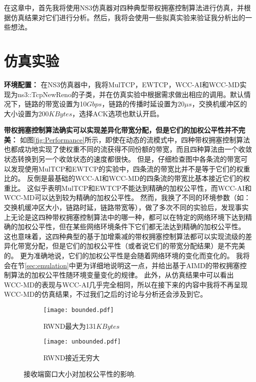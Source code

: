 \documentclass[winfonts]{njuthesis}
\begin{document}
在这章中，首先我将使用NS3仿真器\cite{NS3}对四种典型带权拥塞控制算法进行仿真，并根据仿真结果对它们进行分析。然后，我将会使用一些拟真实验来验证我分析出的一些想法。

\section{仿真实验}
\label{sec:simulation}

\textbf{环境配置：}
在NS3仿真器中，我将MulTCP，EWTCP，WCC-AI和WCC-MD实现为ns3::TcpNewReno的子类，并在仿真实验中根据需求做出相应的调用。默认情况下，链路的带宽设置为10$Gbps$，链路的传播时延设置为20$\mu s$，交换机缓冲区的大小设置为200$KBytes$，选择ACK选项也默认开启。

\textbf{带权拥塞控制算法确实可以实现差异化带宽分配，但是它们的加权公平性并不完美：}
如图\ref{fig:Performance}所示，即使在动态的流模式中，四种带权拥塞控制算法也都成功地实现了使权重不同的流获得不同份额的带宽，而且四种算法由一个收敛状态转换到另一个收敛状态的速度都很快。
但是，仔细检查图中各条流的带宽可以发现使用MulTCP和EWTCP的实验中，四条流的带宽比并不是等于它们的权重比的。
反倒是最基础的WCC-AI和WCC-MD的四条流的带宽比基本接近它们的权重比。
这似乎表明MulTCP和EWTCP不能达到精确的加权公平性，而WCC-AI和WCC-MD可以达到较为精确的加权公平性。
然而，我换了不同的环境参数（如：交换机缓冲区大小，链路时延，链路带宽等），做了多次不同的实验后，发现事实上无论是这四种带权拥塞控制算法中的哪一种，都可以在特定的网络环境下达到精确的加权公平性，但在某些网络环境条件下它们都无法达到精确的加权公平性。
这也意味着，这四种典型的基于加增乘减的带权拥塞控制算法都可以实现流级的差异化带宽分配，但是它们的加权公平性（或者说它们的带宽分配结果）是不完美的。
更为准确地说，它们的加权公平性是会随着网络环境的变化而变化的。
我将会在节\ref{sec:emulation}中更为详细地说明这一点，并给出基于AIMD的带权拥塞控制算法的加权公平性随环境变量变化的规律。
此外，从仿真结果中可以看出WCC-MD的表现与WCC-AI几乎完全相同，所以在接下来的内容中我将不再呈现WCC-MD的仿真结果，不过我们之后的讨论与分析还会涉及到它。

\begin{figure}[ht]
	\begin{subfigure}{.5\textwidth}
    \centering
    \texttt{[image: bounded.pdf]}
    \caption{RWND最大为131$KBytes$}
		\label{fig:BoundedCwnd}
  \end{subfigure}
	\begin{subfigure}{.5\textwidth}
		\centering
    \texttt{[image: unbounded.pdf]}
    \caption{RWND接近无穷大}
		\label{fig:UnbounedCwnd}
  \end{subfigure}
	\caption{接收端窗口大小对加权公平性的影响.}
	\label{fig:EndHostBuffer}
\end{figure}
\end{document}

